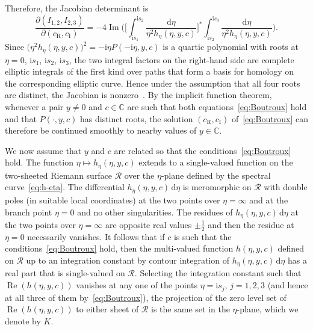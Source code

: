 \documentclass[pdftex]{sigma}
\numberwithin{equation}{section}
\begin{document}
Therefore, the Jacobian determinant is
\begin{equation*}
\frac{\partial (I_{1,2},I_{2,3})}{\partial (c_\mathrm{R},c_\mathrm{I})}
= -4\operatorname{Im}\bigg(\bigg[\int_{\mathrm{i} s_1}^{\mathrm{i} s_2}\frac{\mathrm{d}\eta}{\eta^2h_\eta(\eta,y,c)}\bigg]^*
\int_{\mathrm{i} s_2}^{\mathrm{i} s_3}\frac{\mathrm{d}\eta}{\eta^2h_\eta(\eta,y,c)}\bigg).
\end{equation*}
Since $\bigl(\eta^2h_\eta(\eta,y,c)\bigr)^2 = -\mathrm{i}\eta P(-\mathrm{i}\eta,y,c)$ is a quartic polynomial with roots at $\eta=0$, $\mathrm{i} s_1$, $\mathrm{i} s_2$, $\mathrm{i} s_3$, the two integral factors on the right-hand side are complete elliptic integrals of the first kind over paths that form a basis for homology on the corresponding elliptic curve. Hence under the assumption that all four roots are distinct, the Jacobian is nonzero~\cite[Corollary 1]{Dubrovin81}. By the implicit function theorem, whenever a pair $y\neq 0$ and $c\in\mathbb{C}$ are such that both equations~\eqref{eq:Boutroux} hold and that $P(\cdot,y,c)$ has distinct roots, the solution $(c_\mathrm{R},c_\mathrm{I})$ of~\eqref{eq:Boutroux} can therefore be continued smoothly to nearby values of $y\in\mathbb{C}$.

We now assume that $y$ and $c$ are related so that the conditions~\eqref{eq:Boutroux} hold. The function $\eta\mapsto h_\eta(\eta,y,c)$ extends to a single-valued function on the two-sheeted Riemann surface $\mathcal{R}$ over the $\eta$-plane defined by the spectral curve~\eqref{eq:h-eta}. The differential $h_\eta(\eta,y,c)\,\mathrm{d}\eta$ is meromorphic on $\mathcal{R}$ with double poles (in suitable local coordinates) at the two points over $\eta=\infty$ and at the branch point $\eta=0$ and no other singularities. The residues of $h_\eta(\eta,y,c)\,\mathrm{d}\eta$ at the two points over $\eta=\infty$ are opposite real values $\pm\frac{1}{2}$ and then the residue at $\eta=0$ necessarily vanishes. It follows that if $c$ is such that the conditions~\eqref{eq:Boutroux} hold, then the multi-valued function $h(\eta,y,c)$ defined on $\mathcal{R}$ up to an integration constant by contour integration of $h_\eta(\eta,y,c)\,\mathrm{d}\eta$ has a real part that is single-valued on $\mathcal{R}$. Selecting the integration constant such that $\operatorname{Re}(h(\eta,y,c))$ vanishes at any one of the points $\eta=\mathrm{i} s_j$, $j=1,2,3$ (and hence at all three of them by~\eqref{eq:Boutroux}), the projection of the zero level set of $\operatorname{Re}(h(\eta,y,c))$ to either sheet of $\mathcal{R}$ is the same set in the $\eta$-plane, which we denote by $K$.
\end{document}
